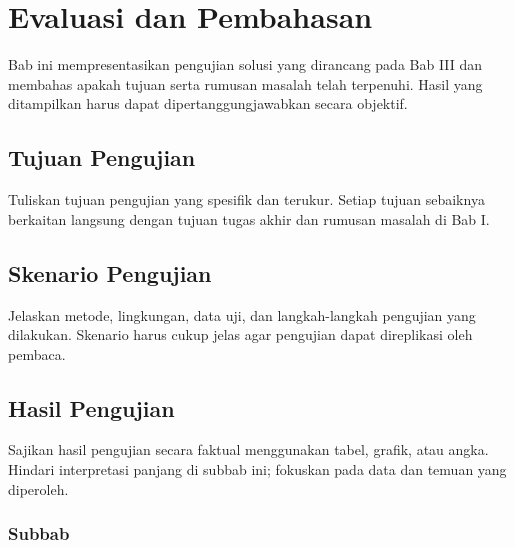 %
%
%
%
%

\chapter{Evaluasi dan Pembahasan}

Bab ini mempresentasikan pengujian solusi yang dirancang pada Bab
III dan membahas apakah tujuan serta rumusan masalah telah
terpenuhi. Hasil yang ditampilkan harus dapat dipertanggungjawabkan
secara objektif.

\section{Tujuan Pengujian}

Tuliskan tujuan pengujian yang spesifik dan terukur. Setiap tujuan
sebaiknya berkaitan langsung dengan tujuan tugas akhir dan
rumusan masalah di Bab I.

\blindtext%

\section{Skenario Pengujian}

Jelaskan metode, lingkungan, data uji, dan langkah-langkah
pengujian yang dilakukan. Skenario harus cukup jelas agar pengujian
dapat direplikasi oleh pembaca.

\blindtext%

\section{Hasil Pengujian}

Sajikan hasil pengujian secara faktual menggunakan tabel, grafik,
atau angka. Hindari interpretasi panjang di subbab ini; fokuskan
pada data dan temuan yang diperoleh.

    \subsection{Subbab}

    \blindtext%

